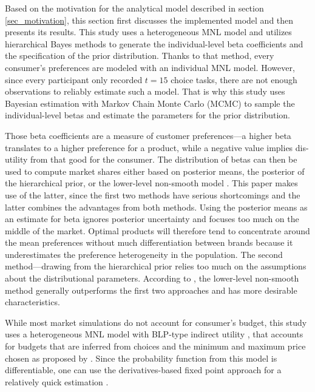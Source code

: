 \documentclass[12pt,a4paper]{article}
\begin{document}
Based on the motivation for the analytical model described in section \ref{sec_motivation}, this section first discusses the implemented model and then presents its results.
This study uses a heterogeneous MNL model and utilizes hierarchical Bayes methods to generate the individual-level beta coefficients and the specification of the prior distribution.
Thanks to that method, every consumer's preferences are modeled with an individual MNL model.
However, since every participant only recorded $t=15$ choice tasks, there are not enough observations to reliably estimate such a model.
That is why this study uses Bayesian estimation with Markov Chain Monte Carlo (MCMC) to sample the individual-level betas and estimate the parameters for the prior distribution.

Those beta coefficients are a measure of customer preferences---a higher beta translates to a higher preference for a product, while a negative value implies dis-utility from that good for the consumer.
The distribution of betas can then be used to compute market shares either based on posterior means, the posterior of the hierarchical prior, or the lower-level non-smooth model \citep{pachaliHowGeneralizeHierarchical2017}.
This paper makes use of the latter, since the first two methods have serious shortcomings and the latter combines the advantages from both methods.
Using the posterior means as an estimate for beta ignores posterior uncertainty and focuses too much on the middle of the market.
Optimal products will therefore tend to concentrate around the mean preferences without much differentiation between brands because it underestimates the preference heterogeneity in the population.
The second method---drawing from the hierarchical prior relies too much on the assumptions about the distributional parameters. 
According to \cite{pachaliHowGeneralizeHierarchical2017}, the lower-level non-smooth method generally outperforms the first two approaches and has more desirable characteristics.

While most market simulations do not account for consumer's budget, this study uses a heterogeneous MNL model with BLP-type indirect utility \citep{berryAutomobilePricesMarket1995}, that accounts for budgets that are inferred from choices and the minimum and maximum price chosen as proposed by \cite{pachaliPerilsIgnoringBudget2017}.
Since the probability function from this model is differentiable, one can use the derivatives-based fixed point approach for a relatively quick estimation \citep{morrowFixedPointApproachesComputing2011a}.
\end{document}
